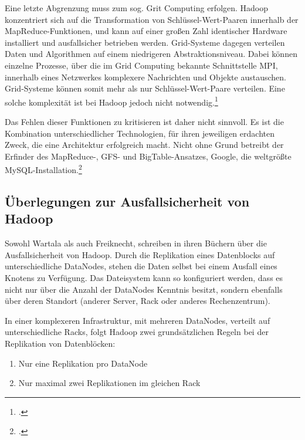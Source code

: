 Eine letzte Abgrenzung muss zum sog. Grit Computing erfolgen. Hadoop konzentriert sich auf die Transformation von Schlüssel-Wert-Paaren innerhalb der MapReduce-Funktionen, und kann auf einer großen Zahl identischer Hardware installiert und ausfallsicher betrieben werden. Grid-Systeme dagegen verteilen Daten und Algorithmen auf einem niedrigeren Abstraktionsniveau. Dabei können einzelne Prozesse, über die im Grid Computing bekannte Schnittstelle \ac{MPI}, innerhalb eines Netzwerkes komplexere Nachrichten und Objekte austauschen. Grid-Systeme können somit mehr als nur Schlüssel-Wert-Paare verteilen. Eine solche komplexität ist bei Hadoop jedoch nicht notwendig.\footcite[Vgl.][S. 30-33]{Wartala.2012}

Das Fehlen dieser Funktionen zu kritisieren ist daher nicht sinnvoll. Es ist die Kombination unterschiedlicher Technologien, für ihren jeweiligen erdachten Zweck, die eine Architektur erfolgreich macht. \flqq Nicht ohne Grund betreibt der Erfinder des MapReduce-, \ac{GFS}- und BigTable-Ansatzes, Google, die weltgrößte MySQL-Installation.\frqq\footcite[S. 31]{Wartala.2012}


\subsection{Überlegungen zur Ausfallsicherheit von Hadoop}
Sowohl Wartala als auch Freiknecht, schreiben in ihren Büchern über die Ausfallsicherheit von Hadoop. Durch die Replikation eines Datenblocks auf unterschiedliche DataNodes, stehen die Daten selbst bei einem Ausfall eines Knotens zu Verfügung. Das Dateisystem kann so konfiguriert werden, dass es nicht nur über die Anzahl der DataNodes Kenntnis besitzt, sondern ebenfalls über deren Standort (anderer Server, Rack oder anderes Rechenzentrum).

In einer komplexeren Infrastruktur, mit mehreren DataNodes, verteilt auf unterschiedliche Racks, folgt Hadoop zwei grundsätzlichen Regeln bei der Replikation von Datenblöcken:

\begin{enumerate}
	\item Nur eine Replikation pro DataNode
	\item Nur maximal zwei Replikationen im gleichen Rack
\end{enumerate}

